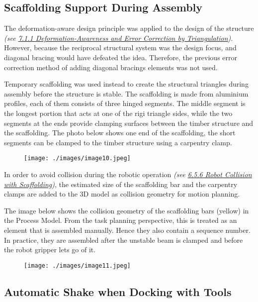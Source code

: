 \subsection{Scaffolding Support During Assembly}

The deformation-aware design principle was applied to the design of the structure \textit{(see \uline{7.1.1 Deformation-Awareness and Error Correction by Triangulation})}. However, because the reciprocal structural system was the design focus, and diagonal bracing would have defeated the idea. Therefore, the previous error correction method of adding diagonal bracings elements was not used.

Temporary scaffolding was used instead to create the structural triangles during assembly before the structure is stable. The scaffolding is made from aluminium profiles, each of them consists of three hinged segments. The middle segment is the longest portion that acts at one of the rigi triangle sides, while the two segments at the ends provide clamping surfaces between the timber structure and the scaffolding. The photo below shows one end of the scaffolding, the short segments can be clamped to the timber structure using a carpentry clamp.

\begin{figure}[H]
\texttt{[image: ./images/image10.jpeg]}
\end{figure}


In order to avoid collision during the robotic operation \textit{(see \uline{6.5.6 Robot Collision with Scaffolding})}, the estimated size of the scaffolding bar and the carpentry clamps are added to the 3D model as collision geometry for motion planning.

The image below shows the collision geometry of the scaffolding bars (yellow) in the Process Model. From the task planning perspective, this is treated as an element that is assembled manually. Hence they also contain a sequence number. In practice, they are assembled after the unstable beam is clamped and before the robot gripper lets go of it.

\begin{figure}[H]
\texttt{[image: ./images/image11.jpeg]}
\end{figure}


\subsection{Automatic Shake when Docking with Tools}


